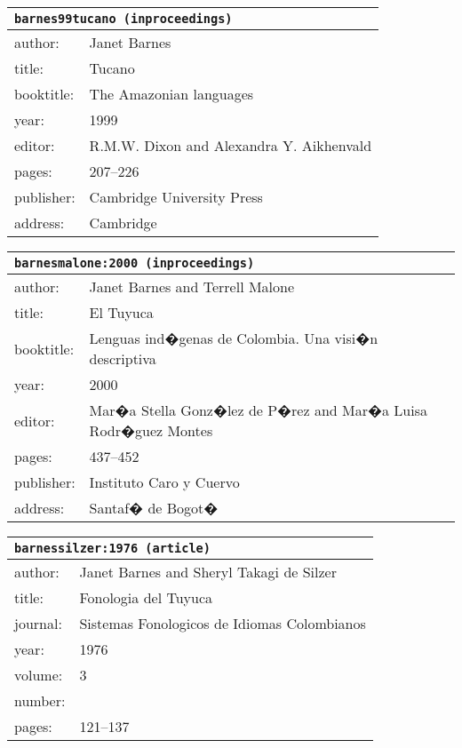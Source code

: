 \documentclass{article}
\begin{document}
\bigskip

\begin{tabular}{p{}p{}}
\multicolumn{2}{l}{\texttt{barnes99tucano (inproceedings)}}\\
\hline
author: & Janet Barnes\\
title: & Tucano\\
booktitle: & The Amazonian languages\\
year: & 1999\\
editor: & R.M.W. Dixon and Alexandra Y. Aikhenvald\\
pages: & 207--226\\
publisher: & Cambridge University Press\\
address: & Cambridge\\
\end{tabular}

\bigskip

\begin{tabular}{p{}p{}}
\multicolumn{2}{l}{\texttt{barnesmalone:2000 (inproceedings)}}\\
\hline
author: & Janet Barnes and Terrell Malone\\
title: & El Tuyuca\\
booktitle: & Lenguas ind�genas de Colombia. Una visi�n descriptiva\\
year: & 2000\\
editor: & Mar�a Stella Gonz�lez {de P�rez} and Mar�a Luisa Rodr�guez Montes\\
pages: & 437--452\\
publisher: & Instituto Caro y Cuervo\\
address: & Santaf� de Bogot�\\
\end{tabular}

\bigskip

\begin{tabular}{p{}p{}}
\multicolumn{2}{l}{\texttt{barnessilzer:1976 (article)}}\\
\hline
author: & Janet Barnes and Sheryl Takagi {de Silzer}\\
title: & Fonologia del Tuyuca\\
journal: & Sistemas Fonologicos de Idiomas Colombianos\\
year: & 1976\\
volume: & 3\\
number: & \\
pages: & 121--137\\
\end{tabular}
\end{document}
